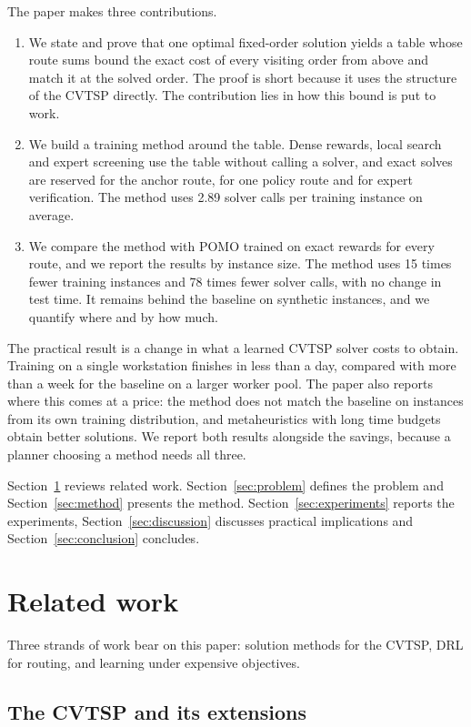\documentclass[preprint,12pt,authoryear]{elsarticle}
\begin{document}
The paper makes three contributions.
\begin{enumerate}
\item We state and prove that one optimal fixed-order solution yields a table whose route sums bound the exact cost of every visiting order from above and match it at the solved order. The proof is short because it uses the structure of the CVTSP directly. The contribution lies in how this bound is put to work.
\item We build a training method around the table. Dense rewards, local search and expert screening use the table without calling a solver, and exact solves are reserved for the anchor route, for one policy route and for expert verification. The method uses 2.89 solver calls per training instance on average.
\item We compare the method with POMO trained on exact rewards for every route, and we report the results by instance size. The method uses 15 times fewer training instances and 78 times fewer solver calls, with no change in test time. It remains behind the baseline on synthetic instances, and we quantify where and by how much.
\end{enumerate}

The practical result is a change in what a learned CVTSP solver costs to obtain. Training on a single workstation finishes in less than a day, compared with more than a week for the baseline on a larger worker pool. The paper also reports where this comes at a price: the method does not match the baseline on instances from its own training distribution, and metaheuristics with long time budgets obtain better solutions. We report both results alongside the savings, because a planner choosing a method needs all three.

Section~\ref{sec:related} reviews related work. Section~\ref{sec:problem} defines the problem and Section~\ref{sec:method} presents the method. Section~\ref{sec:experiments} reports the experiments, Section~\ref{sec:discussion} discusses practical implications and Section~\ref{sec:conclusion} concludes.

\section{Related work}
\label{sec:related}

Three strands of work bear on this paper: solution methods for the CVTSP, DRL for routing, and learning under expensive objectives.

\subsection{The CVTSP and its extensions}
\end{document}
